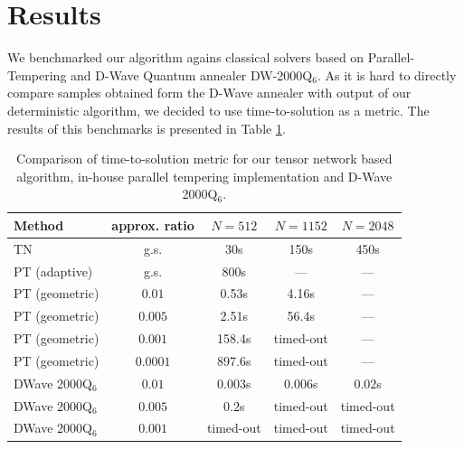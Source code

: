 \section{Results}
We benchmarked our algorithm agains classical solvers based on Parallel-Tempering
and D-Wave Quantum annealer DW-2000Q$_6$. As it is hard to directly compare samples
obtained form the D-Wave annealer with output of our deterministic algorithm,
we decided to use time-to-solution as a metric. The results of this benchmarks
is presented in Table \ref{tab:tnvspt}.


\begin{table}
\centering
\begin{tabular}{|l|c|ccc|}
  \hline
\rowcolor{theader}  Method & approx. ratio & $N=512$ & $N=1152$ & $N=2048$ \\
\hline
  TN & g.s. & 30s& 150s & 450s \\
  \hline
\hline
PT (adaptive) & g.s. & 800s & --- & --- \\
\hline
PT (geometric)& $0.01$ & 0.53s & 4.16s & --- \\
PT (geometric)& $0.005$ & 2.51s & 56.4s & --- \\
PT (geometric)& $0.001$ & 158.4s & timed-out & --- \\
PT (geometric)& $0.0001$ & 897.6s & timed-out & --- \\
\hline
\hline
DWave 2000Q$_6$ & $0.01$ & $0.003$s & $0.006$s & $0.02$s \\
DWave 2000Q$_6$ & $0.005$ & $0.2$s & timed-out & timed-out \\
DWave 2000Q$_6$ & $0.001$ & timed-out & timed-out  & timed-out \\
\hline
\hline
\end{tabular}
\caption{Comparison of time-to-solution metric for our tensor network
  based algorithm, in-house parallel tempering implementation and
  D-Wave 2000Q$_{6}$.}
\label{tab:tnvspt}
\end{table}
